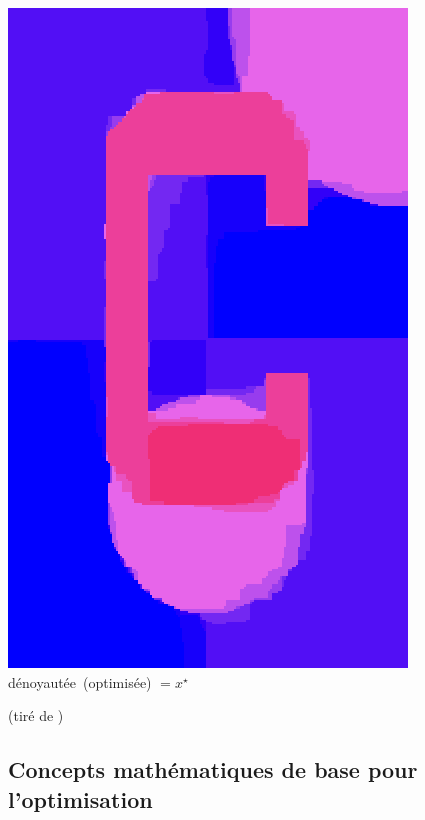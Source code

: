 \documentclass[12pt]{beamer}
\begin{document}
\begin{frame}
\begin{center}
\begin{minipage}[t]{0.2\textwidth}
\includegraphics[width=\textwidth]{c_denoised.png} \\
{\small \mbox{dénoyautée (optimisée)} $=x^\star$}
\end{minipage}
\mbox{\quad}
\end{center}
{\scriptsize (tiré de \cite{ravikumar17}) \hfill}
\end{frame}


\subsection{Concepts mathématiques de base pour l'optimisation}
\end{document}
